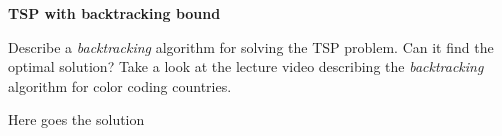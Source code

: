 \question \textbf{TSP with backtracking bound}

Describe a \textit{backtracking} algorithm for solving the TSP problem. Can it find the optimal solution? Take a look at the lecture video describing the \textit{backtracking} algorithm for color coding countries.


\begin{solution}
Here goes the solution
\end{solution}

